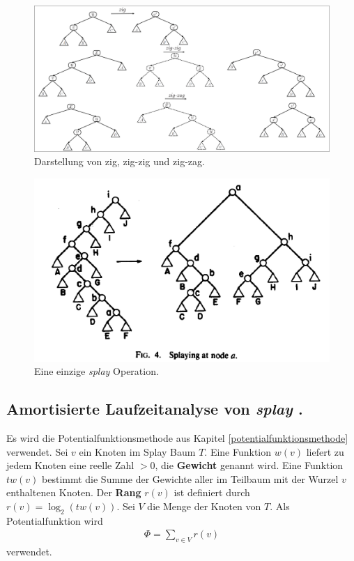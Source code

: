 \documentclass[a4paper,12pt]{article}
\begin{document}
\begin{figure}[H]
	\centering
	\includegraphics[width= 1.2\textwidth]{Medien/Splaybaum/zigZag}
	\caption{Darstellung von zig, zig-zig und zig-zag. }
	\label{fig:zigZag}
\end{figure}
\begin{figure}[H]
	\centering
	\includegraphics[width= 1\textwidth]{Medien/Splaybaum/splay}
	\caption{Eine einzige \textit{splay } Operation.\cite{splay}}
	\label{fig:splay}
\end{figure}

\subsection{Amortisierte Laufzeitanalyse von \textit{splay }.}
Es wird die Potentialfunktionsmethode aus Kapitel \ref{potentialfunktionsmethode} verwendet. Sei $v$ ein Knoten im Splay Baum $T$. Eine Funktion $w\left(v\right)$ liefert zu jedem Knoten eine reelle Zahl $>0$, die \textbf{Gewicht} genannt wird. Eine Funktion $\mathit{tw}\left(v\right)$ bestimmt die Summe der Gewichte aller im Teilbaum mit der Wurzel $v$ enthaltenen Knoten. Der \textbf{Rang}  $r\left(v\right)$ ist definiert durch $r\left(v\right) = \log_2 \left( \mathit{tw}\left(v\right)\right)$. Sei $V$ die Menge der Knoten von $T$. Als Potentialfunktion wird 
\begin{align*}
\Phi = \sum_{v \in V} r\left(v\right)
\end{align*}
verwendet.
\end{document}
